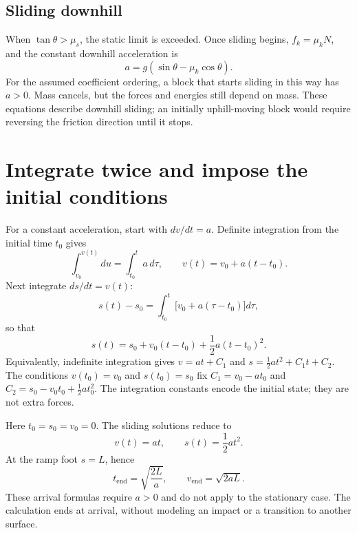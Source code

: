 \subsection{Sliding downhill}
When $\tan\theta>\mu_s$, the static limit is exceeded. Once sliding begins,
$f_k=\mu_k N$, and the constant downhill acceleration is
\begin{equation}
a=g(\sin\theta-\mu_k\cos\theta).
\end{equation}
For the assumed coefficient ordering, a block that starts sliding in this
way has $a>0$. Mass cancels, but the forces and energies still depend on mass.
These equations describe downhill sliding; an initially uphill-moving block
would require reversing the friction direction until it stops.

\section{Integrate twice and impose the initial conditions}
For a constant acceleration, start with $dv/dt=a$. Definite integration
from the initial time $t_0$ gives
\begin{equation}
\int_{v_0}^{v(t)}du=\int_{t_0}^{t}a\,d\tau,
\qquad v(t)=v_0+a(t-t_0).
\end{equation}
Next integrate $ds/dt=v(t)$:
\begin{equation}
s(t)-s_0=\int_{t_0}^{t}\bigl[v_0+a(\tau-t_0)\bigr]d\tau,
\end{equation}
so that
\begin{equation}
s(t)=s_0+v_0(t-t_0)+\frac12 a(t-t_0)^2.
\end{equation}
Equivalently, indefinite integration gives $v=at+C_1$ and
$s=\tfrac12at^2+C_1t+C_2$. The conditions $v(t_0)=v_0$ and $s(t_0)=s_0$
fix $C_1=v_0-at_0$ and $C_2=s_0-v_0t_0+\tfrac12at_0^2$.
The integration constants encode the initial state; they are not extra forces.

Here $t_0=s_0=v_0=0$. The sliding solutions reduce to
\begin{equation}
v(t)=at,\qquad s(t)=\frac12at^2.
\end{equation}
At the ramp foot $s=L$, hence
\begin{equation}
t_{\mathrm{end}}=\sqrt{\frac{2L}{a}},\qquad
v_{\mathrm{end}}=\sqrt{2aL}.
\end{equation}
These arrival formulas require $a>0$ and do not apply to the stationary case.
The calculation ends at arrival, without modeling an impact or a transition
to another surface.

